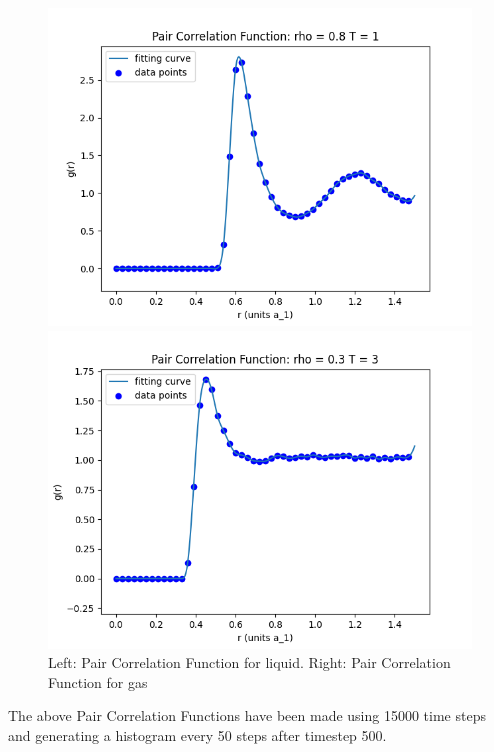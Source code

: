 \documentclass[a4paper,12pt]{article} %
\begin{document}
\begin{figure}[!h]
    \begin{minipage}{.5\textwidth}
  \centering
  \includegraphics[width=1\linewidth]{Data/pair_correlation_Liquid.png}
\end{minipage}%
\begin{minipage}{.5\textwidth}
  \centering
  \includegraphics[width=1\linewidth]{Data/pair_correlation_Gas.png}

\end{minipage}
\caption{Left: Pair Correlation Function for liquid. Right: Pair Correlation Function for gas}
\end{figure}
The above Pair Correlation Functions have been made using 15000 time steps and generating a histogram every 50 steps after timestep 500.
\newpage
\end{document}
